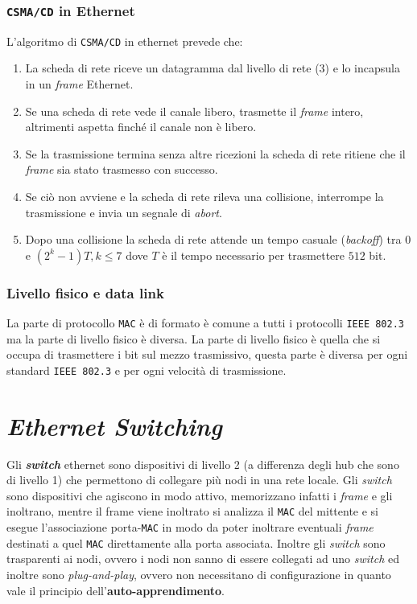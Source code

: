         \subsubsection{\texttt{CSMA/CD} in Ethernet} 
            L'algoritmo di \texttt{CSMA/CD} in ethernet prevede che:
            \begin{enumerate}
                \item La scheda di rete riceve un datagramma dal livello di rete (3) e lo incapsula in un \textit{frame} Ethernet.
                \item Se una scheda di rete vede il canale libero, trasmette il \textit{frame} intero, altrimenti aspetta finché il canale non è libero.
                \item Se la trasmissione termina senza altre ricezioni la scheda di rete ritiene che il \textit{frame} sia stato trasmesso con successo.
                \item Se ciò non avviene e la scheda di rete rileva una collisione, interrompe la trasmissione e invia un segnale di \textit{abort}.
                \item Dopo una collisione la scheda di rete attende un tempo casuale (\textit{backoff}) tra $0$ e $\left(2^k-1\right)T, k\leq 7$ dove $T$ è il tempo necessario per trasmettere $512$ bit.
            \end{enumerate}
        \subsubsection{Livello fisico e data link} 
            La parte di protocollo \texttt{MAC} è di formato è comune a tutti i protocolli \texttt{IEEE 802.3} ma la parte di livello fisico è diversa. La parte di livello fisico è quella che si occupa di trasmettere i bit sul mezzo trasmissivo, questa parte è diversa per ogni standard \texttt{IEEE 802.3} e per ogni velocità di trasmissione.
\section{\textit{Ethernet Switching}}
    Gli \textbf{\textit{switch}} ethernet sono dispositivi di livello 2 (a differenza degli hub che sono di livello 1) che permettono di collegare più nodi in una rete locale. Gli \textit{switch} sono dispositivi che agiscono in modo attivo, memorizzano infatti i \textit{frame} e gli inoltrano, mentre il frame viene inoltrato si analizza il \texttt{MAC} del mittente e si esegue l'associazione porta-\texttt{MAC} in modo da poter inoltrare eventuali \textit{frame} destinati a quel \texttt{MAC} direttamente alla porta associata.\newline
    Inoltre gli \textit{switch} sono trasparenti ai nodi, ovvero i nodi non sanno di essere collegati ad uno \textit{switch} ed inoltre sono \textit{plug-and-play}, ovvero non necessitano di configurazione in quanto vale il principio dell'\textbf{auto-}\textbf{apprendimento}.
